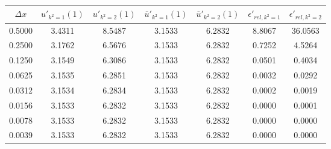 \begin{tabular}{|c|c|c|c|c|c|c|}
\hline
\textbf{$\Delta x$}&\textbf{$u'_{k^2=1}(1)$}&\textbf{$u'_{k^2=2}(1)$}&\textbf{$\bar{u}'_{k^2=1}(1)$}&\textbf{$\bar{u}'_{k^2=2}(1)$}&\textbf{$\epsilon'_{rel,k^2=1}$}&\textbf{$\epsilon'_{rel,k^2=2}$}\\\hline
0.5000&3.4311&8.5487&3.1533&6.2832&8.8067&36.0563\\\hline
0.2500&3.1762&6.5676&3.1533&6.2832&0.7252&4.5264\\\hline
0.1250&3.1549&6.3086&3.1533&6.2832&0.0501&0.4034\\\hline
0.0625&3.1535&6.2851&3.1533&6.2832&0.0032&0.0292\\\hline
0.0312&3.1534&6.2834&3.1533&6.2832&0.0002&0.0019\\\hline
0.0156&3.1533&6.2832&3.1533&6.2832&0.0000&0.0001\\\hline
0.0078&3.1533&6.2832&3.1533&6.2832&0.0000&0.0000\\\hline
0.0039&3.1533&6.2832&3.1533&6.2832&0.0000&0.0000\\\hline
\end{tabular}
